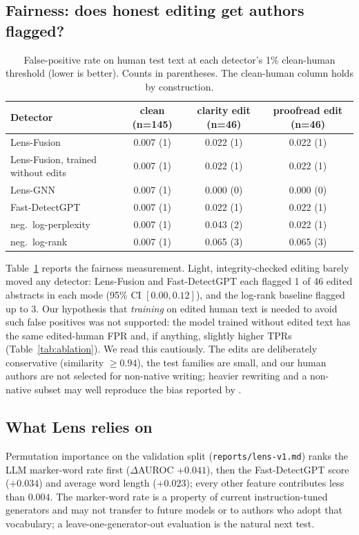 \documentclass[11pt]{article}
\begin{document}
\subsection{Fairness: does honest editing get authors flagged?}

\begin{table}[t]
\centering
\caption{False-positive rate on human test text at each detector's 1\% clean-human threshold (lower is better). Counts in parentheses. The clean-human column holds by construction.}
\label{tab:fpr}
\small
\begin{tabular}{lccc}
\toprule
Detector & clean (n=145) & clarity edit (n=46) & proofread edit (n=46) \\
\midrule
Lens-Fusion & 0.007 (1) & 0.022 (1) & 0.022 (1) \\
Lens-Fusion, trained without edits & 0.007 (1) & 0.022 (1) & 0.022 (1) \\
Lens-GNN & 0.007 (1) & 0.000 (0) & 0.000 (0) \\
Fast-DetectGPT & 0.007 (1) & 0.022 (1) & 0.022 (1) \\
neg.\ log-perplexity & 0.007 (1) & 0.043 (2) & 0.022 (1) \\
neg.\ log-rank & 0.007 (1) & 0.065 (3) & 0.065 (3) \\
\bottomrule
\end{tabular}
\end{table}

Table~\ref{tab:fpr} reports the fairness measurement.
Light, integrity-checked editing barely moved any detector: Lens-Fusion and Fast-DetectGPT each flagged 1 of 46 edited abstracts in each mode (95\% CI $[0.00, 0.12]$), and the log-rank baseline flagged up to 3.
Our hypothesis that \emph{training} on edited human text is needed to avoid such false positives was not supported: the model trained without edited text has the same edited-human FPR and, if anything, slightly higher TPRs (Table~\ref{tab:ablation}).
We read this cautiously.
The edits are deliberately conservative (similarity $\geq 0.94$), the test families are small, and our human authors are not selected for non-native writing; heavier rewriting and a non-native subset may well reproduce the bias reported by \citet{liang2023biased}.

\subsection{What Lens relies on}

Permutation importance on the validation split (\texttt{reports/lens-v1.md}) ranks the LLM marker-word rate first ($\Delta$AUROC $+0.041$), then the Fast-DetectGPT score ($+0.034$) and average word length ($+0.023$); every other feature contributes less than $0.004$.
The marker-word rate is a property of current instruction-tuned generators and may not transfer to future models or to authors who adopt that vocabulary; a leave-one-generator-out evaluation is the natural next test.
\end{document}

